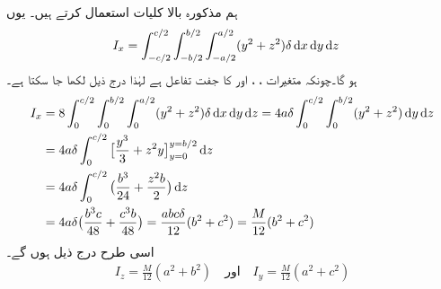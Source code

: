 ہم مذکورہ بالا کلیات استعمال کرتے ہیں۔ یوں
\begin{align}\label{مساوات_بالکثرت_جمودی_معیار_ایکس}
I_x&=\int_{-c/2}^{c/2}\int_{-b/2}^{b/2}\int_{-a/2}^{a/2} (y^2+z^2)\delta \dif x\dif y\dif z
\end{align}
ہو گا۔چونکہ   متغیرات ،  ، اور  کا جفت تفاعل ہے لہٰذا درج ذیل لکھا جا سکتا ہے۔
\begin{align*}
I_x&=8\int_{0}^{c/2}\int_{0}^{b/2}\int_{0}^{a/2} (y^2+z^2)\delta \dif x\dif y\dif z=4a\delta \int_{0}^{c/2}\int_{0}^{b/2}(y^2+z^2)\dif y\dif z\\
&=4a\delta \int_0^{c/2}\big[\frac{y^3}{3}+z^2y\big]_{y=0}^{y=b/2}\dif z\\
&=4a\delta \int_0^{c/2}\big(\frac{b^3}{24}+\frac{z^2b}{2}\big)\dif z\\
&=4a\delta \big(\frac{b^3c}{48}+\frac{c^3b}{48}\big)=\frac{abc\delta}{12}(b^2+c^2)=\frac{M}{12}(b^2+c^2)
\end{align*}
اسی طرح درج ذیل ہوں گے۔
\begin{align*}
I_z=\frac{M}{12}(a^2+b^2)\quad \text{اور}\quad I_y=\frac{M}{12}(a^2+c^2)
\end{align*}
